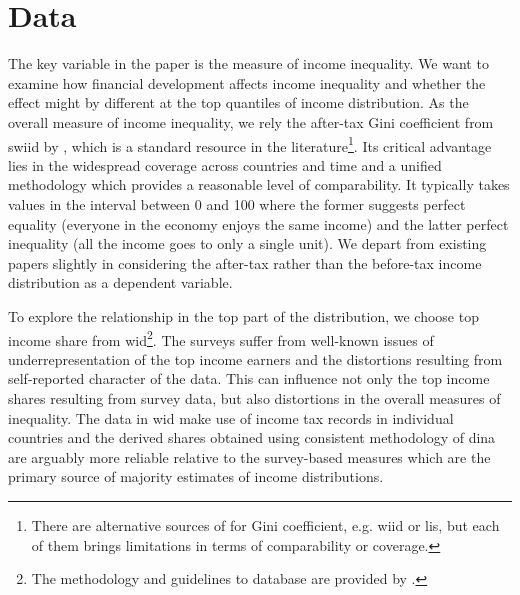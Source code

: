 \documentclass[a4paper,11pt]{article}
\begin{document}

%
%
%
%
%

\section{Data}
The key variable in the paper is the measure of income inequality. We want to examine how financial development affects income inequality and whether the effect might by different at the top quantiles of income distribution. As the overall measure of income inequality, we rely the after-tax Gini coefficient from \ac{swiid} by \citet{Solt2019}, which is a standard resource in the literature\footnote{There are alternative sources of for Gini coefficient, e.g. \ac{wiid} or \ac{lis}, but each of them brings limitations in terms of comparability or coverage.}. Its critical advantage lies in the widespread coverage across countries and time and a unified methodology which provides a reasonable level of comparability. It typically takes values in the interval between 0 and 100 where the former suggests perfect equality (everyone in the economy enjoys the same income) and the latter perfect inequality (all the income goes to only a single unit). We depart from existing papers slightly in considering the after-tax rather than the before-tax income distribution as a dependent variable. 

To explore the relationship in the top part of the distribution, we choose top income share from \ac{wid}\footnote{The methodology and guidelines to database are provided by \citet{alvaredo2016distributional}.}. The surveys suffer from well-known issues of underrepresentation of the top income earners and the distortions resulting from self-reported character of the data. This can influence not only the top income shares resulting from survey data, but also distortions in the overall measures of inequality. The data in \ac{wid} make use of income tax records in individual countries and the derived shares obtained using consistent methodology of \ac{dina} are arguably more reliable relative to the survey-based measures which are the primary source of majority estimates of income distributions. 
\end{document}
